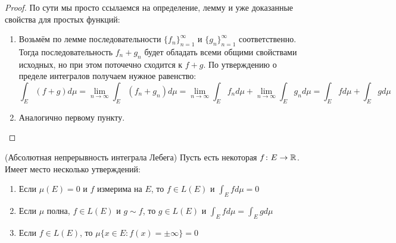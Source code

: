 \begin{proof}
	По сути мы просто ссылаемся на определение, лемму и уже доказанные свойства для простых функций:
	\begin{enumerate}
		\item Возьмём по лемме последовательности $\{f_n\}_{n = 1}^\infty$ и $\{g_n\}_{n = 1}^\infty$ соответственно. Тогда последовательность $f_n + g_n$ будет обладать всеми общими свойствами исходных, но при этом поточечно сходится к $f + g$. По утверждению о пределе интегралов получаем нужное равенство:
		\[
			\int_E (f + g)d\mu = \lim_{n \to \infty} \int_E (f_n + g_n)d\mu = \lim_{n \to \infty} \int_E f_nd\mu + \lim_{n \to \infty} \int_E g_nd\mu = \int_E fd\mu + \int_E gd\mu
		\]
		
		\item Аналогично первому пункту.
	\end{enumerate}
\end{proof}

\begin{theorem} (Абсолютная непрерывность интеграла Лебега)
	Пусть есть некоторая $f \colon E \to \mathbb{R}$. Имеет место несколько утверждений:
	\begin{enumerate}
		\item Если $\mu(E) = 0$ и $f$ измерима на $E$, то $f \in L(E)$ и $\int_E fd\mu = 0$
		
		\item Если $\mu$ полна, $f \in L(E)$ и $g \sim f$, то $g \in L(E)$ и $\int_E fd\mu = \int_E gd\mu$
		
		\item Если $f \in L(E)$, то $\mu\{x \in E \colon f(x) = \pm \infty\} = 0$
	\end{enumerate}
\end{theorem}

